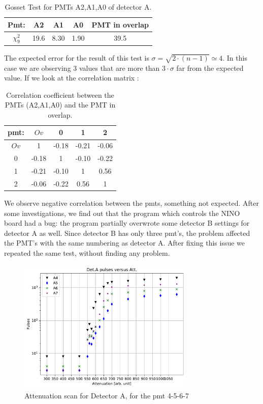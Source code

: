 \begingroup
\setlength{\tabcolsep}{8pt} %
\renewcommand{\arraystretch}{1.2} %
\begin{table}[!ht]
\centering
\begin{tabular}{c|cccc}
\hline 
Pmt: & A2 & A1 & A0 & PMT in overlap \\ 
\hline
$\chi^{2}_{9}$ & 19.6 & 8.30 & 1.90 & 39.5\\ 
\hline
\end{tabular} 
\caption{Gosset Test for PMTs A2,A1,A0 of detector A.}
\label{tab:GossetA0A1A2}
\end{table}
\endgroup
\smallskip

The expected error for the result of this test is $\sigma = \sqrt{2 \cdot (n-1)} \simeq 4$. In this case we are observing 3 values that are more than  $3 \cdot \sigma$ far from the expected value. If we look at the correlation matrix :

\begin{table}[!h]
\centering
\begin{tabular}{ccccc}
\hline 
pmt: & $Ov$ & 0 & 1 & 2 \\ 
\hline 
$Ov$ & 1 & -0.18  & -0.21  & -0.06  \\ 
0 	 & -0.18  & 1 & -0.10  & -0.22  \\ 
1    & -0.21  & -0.10  & 1 & 0.56  \\ 
2    & -0.06 & -0.22  & 0.56  & 1 \\ 
\hline 
\end{tabular}
\caption{Correlation coefficient between the PMTs (A2,A1,A0) and the PMT in overlap.}
\end{table}

We observe negative correlation between the pmts, something not expected. After some investigations, we find out that the program which controls the NINO board had a bug: the program partially overwrote some detector B settings for detector A as well. Since detector B has only three pmt's, the problem affected the PMT's with the same numbering as detector A. After fixing this issue we repeated the same test, without finding any problem. 

\begin{figure}[!htb]
\centering
\includegraphics[width = 0.75\textwidth]{Analysis/AttenuationA(4-7).pdf}
\caption{Attenuation scan for Detector A, for the pmt 4-5-6-7}
\label{fig:ScatDetA}
\end{figure}

